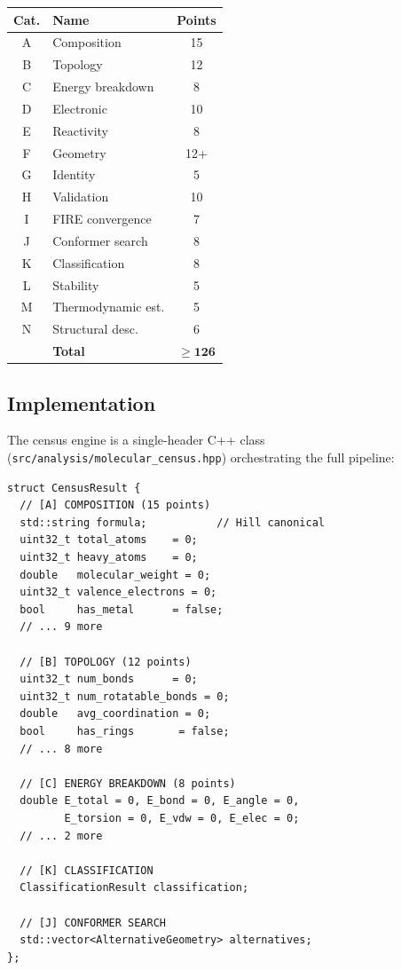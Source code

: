 \documentclass[11pt,a4paper]{article}
\begin{document}
\begin{center}
\begin{tabular}{clc}
\toprule
\textbf{Cat.} & \textbf{Name} & \textbf{Points} \\
\midrule
A & Composition         & 15 \\
B & Topology            & 12 \\
C & Energy breakdown    & 8 \\
D & Electronic          & 10 \\
E & Reactivity          & 8 \\
F & Geometry            & 12+ \\
G & Identity            & 5 \\
H & Validation          & 10 \\
I & FIRE convergence    & 7 \\
J & Conformer search    & 8 \\
K & Classification      & 8 \\
L & Stability           & 5 \\
M & Thermodynamic est.  & 5 \\
N & Structural desc.    & 6 \\
\midrule
  & \textbf{Total}      & $\mathbf{\geq 126}$ \\
\bottomrule
\end{tabular}
\end{center}

\subsection{Implementation}

The census engine is a single-header C++ class
(\texttt{src/analysis/molecular\_census.hpp}) orchestrating the full
pipeline:

\begin{lstlisting}[style=cpp,title={\textbf{CensusResult master struct (abridged, 126+ fields)}}]
struct CensusResult {
  // [A] COMPOSITION (15 points)
  std::string formula;           // Hill canonical
  uint32_t total_atoms    = 0;
  uint32_t heavy_atoms    = 0;
  double   molecular_weight = 0;
  uint32_t valence_electrons = 0;
  bool     has_metal      = false;
  // ... 9 more

  // [B] TOPOLOGY (12 points)
  uint32_t num_bonds      = 0;
  uint32_t num_rotatable_bonds = 0;
  double   avg_coordination = 0;
  bool     has_rings       = false;
  // ... 8 more

  // [C] ENERGY BREAKDOWN (8 points)
  double E_total = 0, E_bond = 0, E_angle = 0,
         E_torsion = 0, E_vdw = 0, E_elec = 0;
  // ... 2 more

  // [K] CLASSIFICATION
  ClassificationResult classification;

  // [J] CONFORMER SEARCH
  std::vector<AlternativeGeometry> alternatives;
};
\end{lstlisting}
\end{document}
